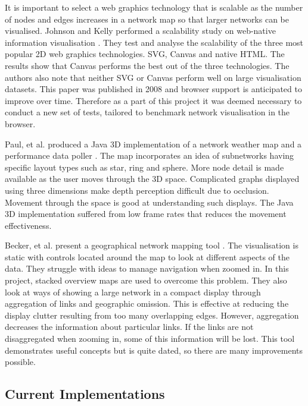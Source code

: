 \documentclass[11pt, a4paper]{article}
\begin{document}
It is important to select a web graphics technology that is scalable as the
number of nodes and edges increases in a network map so that larger networks can
be visualised. Johnson and Kelly performed a scalability study on web-native
information visualisation \cite{Johnson_2008}.  They test and analyse the
scalability of the three most popular 2D web graphics technologies.  SVG, Canvas
and native HTML. The results show that Canvas performs the best out of the three
technologies. The authors also note that neither SVG or Canvas perform well on
large visualisation datasets. This paper was published in 2008 and browser
support is anticipated to improve over time. Therefore as a part of this project
it was deemed necessary to conduct a new set of tests, tailored to benchmark
network visualisation in the browser.


Paul, et al. produced a Java 3D implementation of a network weather map and a
performance data poller \cite{Paul_2000}. The map incorporates an idea of
subnetworks having specific layout types such as star, ring and sphere. More
node detail is made available as the user moves through the 3D space.
Complicated graphs displayed using three dimensions make depth perception
difficult due to occlusion. Movement through the space is good at understanding
such displays. The Java 3D implementation suffered from low frame rates that
reduces the movement effectiveness.


Becker, et al. present a geographical network mapping tool \cite{Becker_1995}.
The visualisation is static with controls located around the map to look at
different aspects of the data. They struggle with ideas to manage navigation
when zoomed in. In this project, stacked overview maps are used to overcome this
problem. They also look at ways of showing a large network in a compact display
through aggregation of links and geographic omission. This is effective at
reducing the display clutter resulting from too many overlapping edges. However,
aggregation decreases the information about particular links. If the links are
not disaggregated when zooming in, some of this information will be lost. This
tool demonstrates useful concepts but is quite dated, so there are many
improvements possible.


\subsection{Current Implementations}
\label{sec:current-implementations}
\end{document}
